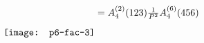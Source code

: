\documentclass{standalone}
\begin{document}
$
 \raisebox{-7.2mm}{\texttt{[image: p6-fac-3]}} =A_4^{(2)}(123)\frac{1}{P^2}A_4^{(6)}(456)
$
\end{document}
